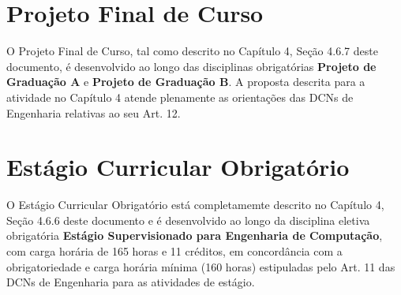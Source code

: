 \section{Projeto Final de Curso}
O Projeto Final de Curso, tal como descrito no Capítulo 4, Seção 4.6.7 deste documento, é 
desenvolvido ao longo das disciplinas obrigatórias \textbf{Projeto de Graduação A} e \textbf{Projeto 
de Graduação B}. A proposta descrita para a atividade no Capítulo 4 atende 
plenamente as orientações das DCNs de Engenharia relativas ao seu Art. 12. 

\section{Estágio Curricular Obrigatório}
O Estágio Curricular Obrigatório está completamemte descrito no Capítulo 4, Seção 4.6.6 deste documento e 
é desenvolvido ao longo da disciplina eletiva obrigatória \textbf{Estágio Supervisionado para Engenharia de Computação}, 
com carga horária de 165 horas e 11 créditos, em concordância com a obrigatoriedade e carga horária mínima (160 horas) estipuladas pelo Art. 11 das DCNs de Engenharia para as atividades de estágio.